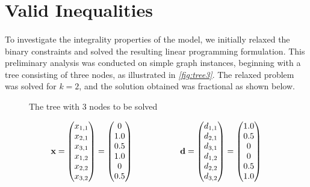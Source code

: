 \section{Valid Inequalities}
\label{sec:valid_inequalities}

\paragraph{} To investigate the integrality properties of the model, we initially relaxed the binary constraints and solved the resulting linear programming formulation. This preliminary analysis was conducted on simple graph instances, beginning with a tree consisting of three nodes, as illustrated in \textsl{\autoref{fig:tree3}}. The relaxed problem was solved for $k=2$, and the solution obtained was fractional as shown below.

\begin{figure}[H]
    \centering
    
    \caption{The tree with 3 nodes to be solved}
    \label{fig:tree3}
\end{figure}

\[
\begin{array}{c@{\hskip 2cm}c}
\textbf{x} = 
\begin{pmatrix}
x_{1,1} \\
x_{2,1} \\
x_{3,1} \\
x_{1,2} \\
x_{2,2} \\
x_{3,2}
\end{pmatrix}
=
\begin{pmatrix}
0 \\
1.0 \\
0.5 \\
1.0 \\
0 \\
0.5
\end{pmatrix}
&
\textbf{d} = 
\begin{pmatrix}
d_{1,1} \\
d_{2,1} \\
d_{3,1} \\
d_{1,2} \\
d_{2,2} \\
d_{3,2}
\end{pmatrix}
=
\begin{pmatrix}
1.0 \\
0.5 \\
0 \\
0 \\
0.5 \\
1.0
\end{pmatrix}
\end{array}
\]

